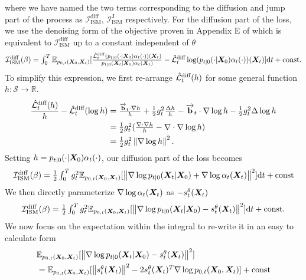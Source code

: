 where we have named the two terms corresponding to the diffusion and jump part of the process as $\mathcal{I}_{\text{ISM}}^{\text{diff}}$, $\mathcal{I}_{\text{ISM}}^{\text{J}}$ respectively. For the diffusion part of the loss, we use the denoising form of the objective proven in Appendix E of \citet{benton2022denoising} which is equivalent to $\mathcal{I}_{\text{ISM}}^{\text{diff}}$ up to a constant independent of $\theta$
\begin{equation}
  \textstyle 
    \mathcal{I}_{\text{ISM}}^{\text{diff}}(\beta) = \int_{0}^T \mathbb{E}_{p_{0, t}({\bm{X}}_0, {\bm{X}}_t)} [ \frac{\hat{\mathcal{L}}^{\text{diff}}_t ( p_{t|0}( \cdot | {\bm{X}}_0) \alpha_t(\cdot))({\bm{X}}_t)}{p_{t|0}({\bm{X}}_t | {\bm{X}}_0) \alpha_t({\bm{X}}_t) } - \hat{\mathcal{L}}^{\text{diff}}_t \log ( p_{t|0}(\cdot | {\bm{X}}_0) \alpha_t(\cdot) ) ({\bm{X}}_t) ] \mathrm{d} t + \text{const} .
\end{equation}
To simplify this expression, we first re-arrange $\hat{\mathcal{L}}^{\text{diff}}_t(h)$ for some general function $h : \mathcal{S} \rightarrow \mathbb{R}$.
\begin{align}
    \frac{\hat{\mathcal{L}}^{\text{diff}}_t(h)}{h} - \hat{\mathcal{L}}^{\text{diff}}_t(\log h) &\textstyle  = \frac{\overrightarrow{\mathbf{b}}_t \cdot \nabla h}{h} + \frac{1}{2} g_t^2 \frac{\Delta h}{h} - \overrightarrow{\mathbf{b}}_t \cdot \nabla \log h - \frac{1}{2} g_t^2 \Delta \log h \\
    &\textstyle = \frac{1}{2} g_t^2 ( \frac{\nabla \cdot \nabla h}{h} - \nabla \cdot \nabla \log h ) \\
    &\textstyle = \frac{1}{2} g_t^2 \left\lVert\nabla \log h\right\rVert^2 . 
\end{align}
Setting $h = p_{t|0}(\cdot | {\bm{X}}_0) \alpha_t(\cdot)$, our diffusion part of the loss becomes
\begin{equation}
  \textstyle 
    \mathcal{I}_{\text{ISM}}^{\text{diff}}(\beta) = \frac{1}{2} \int_{0}^T g_t^2 \mathbb{E}_{p_{0, t}({\bm{X}}_0, {\bm{X}}_t) } [ \left\lVert \nabla \log p_{t|0}({\bm{X}}_t | {\bm{X}}_0) + \nabla \log \alpha_t({\bm{X}}_t) \right\rVert^2 ] \mathrm{d} t + \text{const}
\end{equation}
We then directly parameterize $\nabla \log \alpha_t({\bm{X}}_t)$ as $- s_t^\theta({\bm{X}}_t)$
\begin{equation}
  \textstyle 
    \mathcal{I}_{\text{ISM}}^{\text{diff}}(\beta) = \frac{1}{2} \int_{0}^T g_t^2 \mathbb{E}_{p_{0, t}({\bm{X}}_0, {\bm{X}}_t) } [ \left\lVert \nabla \log p_{t|0}({\bm{X}}_t | {\bm{X}}_0) - s_t^\theta({\bm{X}}_t) \right\rVert^2 ] \mathrm{d} t + \text{const} .
\end{equation}
We now focus on the expectation within the integral to re-write it in an easy to calculate form
\begin{align}
    &\textstyle \mathbb{E}_{p_{0, t}({\bm{X}}_0, {\bm{X}}_t) } [ \left\lVert \nabla \log p_{t|0}({\bm{X}}_t | {\bm{X}}_0) - s_t^\theta({\bm{X}}_t) \right\rVert^2 ] \\
    &\textstyle = \mathbb{E}_{p_{0,t}({\bm{X}}_0, {\bm{X}}_t)} [ \left\lVert s_t^\theta({\bm{X}}_t)\right\rVert^2 - 2 s_t^\theta({\bm{X}}_t)^T \nabla \log p_{0,t}({\bm{X}}_0, {\bm{X}}_t) ] + \text{const}
\end{align}
